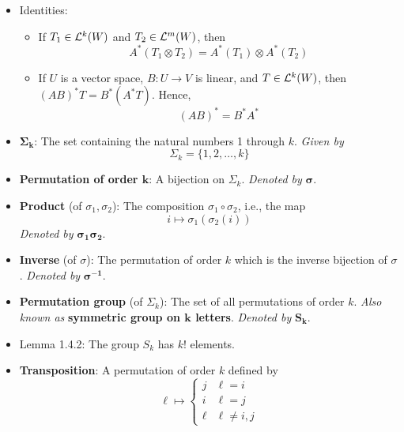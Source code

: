 \documentclass[../notes.tex]{subfiles}
\begin{document}
\begin{itemize}
    \item Identities:
    \begin{itemize}
        \item If $T_1\in\lin[k]{W}$ and $T_2\in\lin[m]{W}$, then
        \begin{equation*}
            A^*(T_1\otimes T_2) = A^*(T_1)\otimes A^*(T_2)
        \end{equation*}
        \item If $U$ is a vector space, $B:U\to V$ is linear, and $T\in\lin[k]{W}$, then $(AB)^*T=B^*(A^*T)$. Hence,
        \begin{equation*}
            (AB)^* = B^*A^*
        \end{equation*}
    \end{itemize}
    \item {}$\bm{\Sigma_k}$: The set containing the natural numbers 1 through $k$. \emph{Given by}
    \begin{equation*}
        \Sigma_k = \{1,2,\dots,k\}
    \end{equation*}
    \item \textbf{Permutation of order $\bm{k}$}: A bijection on $\Sigma_k$. \emph{Denoted by} $\bm{\sigma}$.
    \item \textbf{Product} (of $\sigma_1,\sigma_2$): The composition $\sigma_1\circ\sigma_2$, i.e., the map
    \begin{equation*}
        i \mapsto \sigma_1(\sigma_2(i))
    \end{equation*}
    \emph{Denoted by} $\bm{\sigma_1\sigma_2}$.
    \item \textbf{Inverse} (of $\sigma$): The permutation of order $k$ which is the inverse bijection of $\sigma$. \emph{Denoted by} $\bm{\sigma^{-1}}$.
    \item \textbf{Permutation group} (of $\Sigma_k$): The set of all permutations of order $k$. \emph{Also known as} \textbf{symmetric group on $\bm{k}$ letters}. \emph{Denoted by} $\bm{S_k}$.
    \item Lemma 1.4.2: The group $S_k$ has $k!$ elements.
    \item \textbf{Transposition}: A permutation of order $k$ defined by
    \begin{equation*}
        \ell \mapsto
        \begin{cases}
            j & \ell=i\\
            i & \ell=j\\
            \ell & \ell\neq i,j
        \end{cases}

\end{equation*}
\end{itemize}
\end{document}
